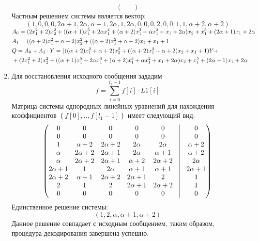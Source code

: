 \documentclass{article}
\numberwithin{equation}{section}
\begin{document}
\begin{enumerate}
\[\begin{pmatrix}
\begin{smallmatrix}
	\end{smallmatrix}
\end{pmatrix}
\]
Частным решением системы является вектор: \\
\[ 
	\left( 1, 0, 0, 0, 2\alpha + 1, 2\alpha, \alpha + 1, 2\alpha, 1, 2\alpha, 0, 0, 0, 2, 0, 0, 1, 1, \alpha + 2, \alpha + 2 \right)
\]
	$
\!
\begin{aligned}[t]
	&A_0 = (2x_1^2 + 2) x_2^2 + ((\alpha + 1) x_1^5 + 2\alpha x_1^4 + (\alpha + 2 )x_1^3 + \alpha x_1^2 + x_1 + 2\alpha) x_2 + x_1^5 + (2\alpha + 1) x_1 + 2\alpha \\
	&A_1 = ((\alpha + 2) x_1^2 + \alpha + 2) x_2^2 + ((\alpha + 2) x_1^2 + \alpha + 2) x_2 + x_1 + 1 \\
	&Q = A_0 + A_1 \cdot Y = (((\alpha + 2) x_1^2 + \alpha + 2) x_2^2 + ((\alpha + 2) x_1^2 + \alpha + 2) x_2 + x_1 + 1) Y + \\
	&+ (2 x_1^2 + 2) x_2^2 + ((\alpha + 1) x_1^5 + 2\alpha x_1^4 + (\alpha + 2) x_1^3 + \alpha x_1^2 + x_1 + 2 \alpha) x_2 + x_1^5 + (2\alpha + 1) x_1 + 2\alpha
\end{aligned} \\
$ \\
\item Для восстановления исходного сообщения зададим
\[
f = \sum_{i=0}^{l_1-1}{f[i] \cdot L1[i]}
\]
Матрица системы однородных линейных уравнений для нахождения коэффициентов $ \left\lbrace f[0],..,f[l_1-1] \right\rbrace $ имеет следующий вид:
\[
\begin{pmatrix}
	\begin{matrix}
		0 & 0 & 0 & 0 & 0 & \vline & 0 \\
		0 & 0 & 0 & 0 & 0 & \vline & 0 \\
		1 & \alpha + 2 & 2\alpha + 2 & 2\alpha & 2\alpha & \vline & \alpha + 2 \\
		\alpha & 2\alpha + 2 & 2\alpha + 1 & 2\alpha & \alpha + 1 & \vline & \alpha + 2 \\
		\alpha & 2\alpha + 2 & 2\alpha + 1 & \alpha + 2 & 2\alpha + 2 & \vline & 2\alpha \\
		2\alpha + 1 & 1 & 2\alpha & \alpha + 1 & \alpha + 1 & \vline & 2\alpha + 1 \\
		2\alpha + 2 & \alpha + 1 & 2\alpha + 2 & 2\alpha + 1 & 2 & \vline & 1 \\
		2 & 1 & 2 & 2\alpha + 1 & 2\alpha + 2 & \vline & 1 \\
		0 & 0 & 0 & 0 & 0 & \vline & 0 \\
	\end{matrix}
\end{pmatrix}
\]
Единственное решение системы:
\[ 
\left( 1, 2, \alpha, \alpha + 1, \alpha + 2 \right)
\]
Данное решение совпадает с исходным сообщением, таким образом, процедура декодирования завершена успешно.
\end{enumerate}
\end{document}
